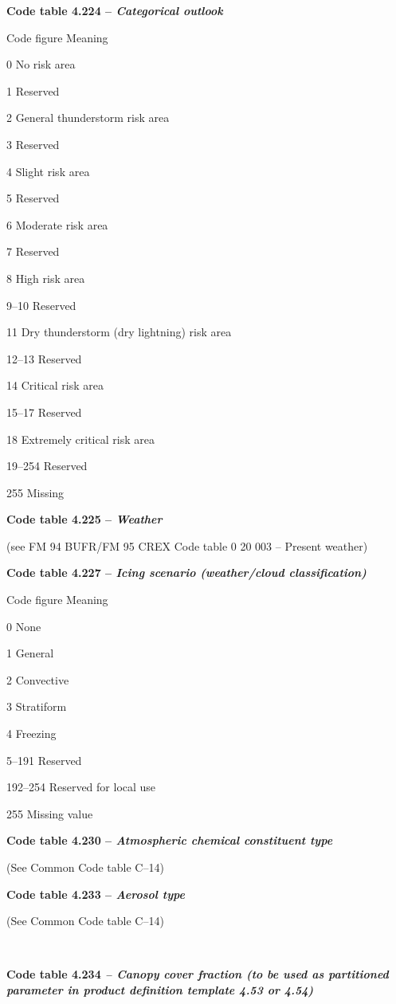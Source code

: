 \textbf{Code table 4.224 -- \emph{Categorical outlook}}

Code figure Meaning

0 No risk area

1 Reserved

2 General thunderstorm risk area

3 Reserved

4 Slight risk area

5 Reserved

6 Moderate risk area

7 Reserved

8 High risk area

9--10 Reserved

11 Dry thunderstorm (dry lightning) risk area

12--13 Reserved

14 Critical risk area

15--17 Reserved

18 Extremely critical risk area

19--254 Reserved

255 Missing

\textbf{Code table 4.225 -- \emph{Weather}}

(see FM 94 BUFR/FM 95 CREX Code table 0 20 003 -- Present weather)

\textbf{Code table 4.227 -- \emph{Icing scenario (weather/cloud classification)}}

Code figure Meaning

0 None

1 General

2 Convective

3 Stratiform

4 Freezing

5--191 Reserved

192--254 Reserved for local use

255 Missing value

\textbf{Code table 4.230 -- \emph{Atmospheric chemical constituent type}}

(See Common Code table C--14)

\textbf{Code table 4.233 -- \emph{Aerosol type}}

(See Common Code table C--14)

\textbf{\\
}

\textbf{Code table 4.234 \emph{-- Canopy cover fraction (to be used as partitioned parameter in product definition template 4.53 or 4.54)}}

